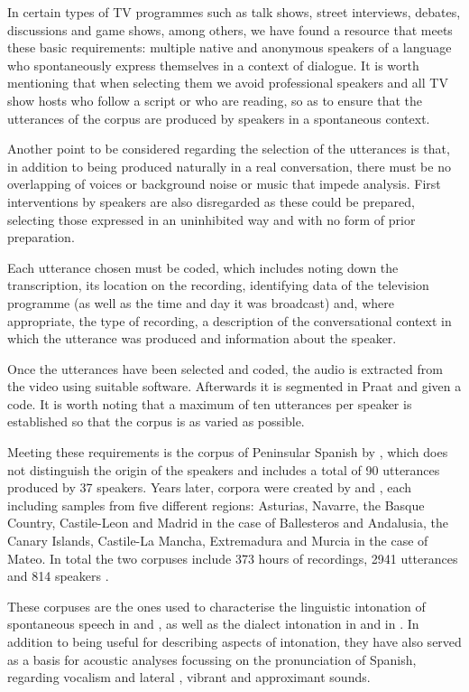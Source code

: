 \documentclass[output=paper]{langscibook}
\begin{document}
In certain types of TV programmes such as talk shows, street interviews, debates, discussions and game shows, among others, we have found a resource that meets these basic requirements: multiple native and anonymous speakers of a language who spontaneously express themselves in a context of dialogue. It is worth mentioning that when selecting them we avoid professional speakers and all TV show hosts who follow a script or who are reading, so as to ensure that the utterances of the corpus are produced by speakers in a spontaneous context. 

Another point to be considered regarding the selection of the utterances is that, in addition to being produced naturally in a real conversation, there must be no overlapping of voices or background noise or music that impede analysis. First interventions by speakers are also disregarded as these could be prepared, selecting those expressed in an uninhibited way and with no form of prior preparation. 

Each utterance chosen must be coded, which includes noting down the transcription, its location on the recording, identifying data of the television programme (as well as the time and day it was broadcast) and, where appropriate, the type of recording, a description of the conversational context in which the utterance was produced and information about the speaker. 

Once the utterances have been selected and coded, the audio is extracted from the video using suitable software. Afterwards it is segmented in Praat and given a code. It is worth noting that a maximum of ten utterances per speaker is established so that the corpus is as varied as possible.

Meeting these requirements is the corpus of Peninsular Spanish by \citet{Alfonso.1999}, which does not distinguish the origin of the speakers and includes a total of 90 utterances produced by 37 speakers. Years later, corpora were created by \citet{BallesterosPanizo.2011} and \citet{MateoRuiz.2014}, each including samples from five different regions: Asturias, Navarre, the Basque Country, Castile-Leon and Madrid in the case of Ballesteros and Andalusia, the Canary Islands, Castile-La Mancha, Extremadura and Murcia in the case of Mateo. In total the two corpuses include 373 hours of recordings, 2941 utterances and 814 speakers \citep{CanteroSerena.2016}.

These corpuses are the ones used to characterise the linguistic intonation of spontaneous speech in \citet{CanteroSerena.op.2002,CanteroSerenaETAL.2005,CanteroSerena.2007} and \citet{FontRotches.2013b}, as well as the dialect intonation in \citet{BallesterosPanizo.2011} and in \citet{MateoRuiz.2014}. In addition to being useful for describing aspects of intonation, they have also served as a basis for acoustic analyses focussing on the pronunciation of Spanish, regarding vocalism \citep{Alfonso.2010} and lateral \citep{Andres.2014}, vibrant \citep{OrtizdePinedoSanchez.2012} and approximant \citep{SolaPrado.2011,SolaPrado.2014} sounds.
\end{document}
